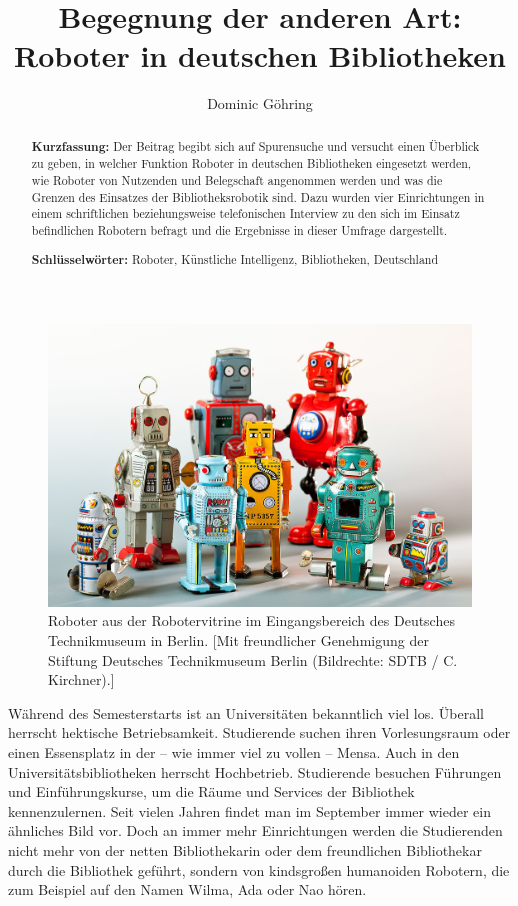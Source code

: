 \documentclass[a4paper,
fontsize=11pt,
oneside,
numbers=noperiodatend,
parskip=half-,
bibliography=totoc,
final
]{scrartcl}
\title{\LARGE{Begegnung der anderen Art: Roboter in deutschen Bibliotheken}}%
\author{Dominic Göhring} %
\date{}
\begin{document}
\maketitle
\thispagestyle{fancyplain} 

\begin{abstract}
\noindent
\textbf{Kurzfassung:} Der Beitrag begibt sich auf Spurensuche und versucht einen Überblick zu
geben, in welcher Funktion Roboter in deutschen Bibliotheken eingesetzt
werden, wie Roboter von Nutzenden und Belegschaft angenommen werden und
was die Grenzen des Einsatzes der Bibliotheksrobotik sind. Dazu wurden
vier Einrichtungen in einem schriftlichen beziehungsweise telefonischen
Interview zu den sich im Einsatz befindlichen Robotern befragt und die
Ergebnisse in dieser Umfrage dargestellt.

\noindent\textbf{Schlüsselwörter:} Roboter, Künstliche Intelligenz, Bibliotheken,
Deutschland
\end{abstract}


\begin{figure}[]
\centering
\includegraphics[width=.7\textwidth]{img/Robotervitrine.jpg}
\caption{Roboter aus der Robotervitrine im Eingangsbereich des Deutsches
Technikmuseum in Berlin. {[}Mit freundlicher Genehmigung der Stiftung Deutsches Technikmuseum Berlin (Bildrechte: SDTB / C. Kirchner).{]}}
\end{figure}

Während des Semesterstarts ist an Universitäten bekanntlich viel los.
Überall herrscht hektische Betriebsamkeit. Studierende suchen ihren
Vorlesungsraum oder einen Essensplatz in der -- wie immer viel zu vollen
-- Mensa. Auch in den Universitätsbibliotheken herrscht Hochbetrieb.
Studierende besuchen Führungen und Einführungskurse, um die Räume und
Services der Bibliothek kennenzulernen. Seit vielen Jahren findet man im
September immer wieder ein ähnliches Bild vor. Doch an immer mehr
Einrichtungen werden die Studierenden nicht mehr von der netten
Bibliothekarin oder dem freundlichen Bibliothekar durch die Bibliothek
geführt, sondern von kindsgroßen humanoiden Robotern, die zum Beispiel
auf den Namen Wilma, Ada oder Nao hören.
\end{document}
